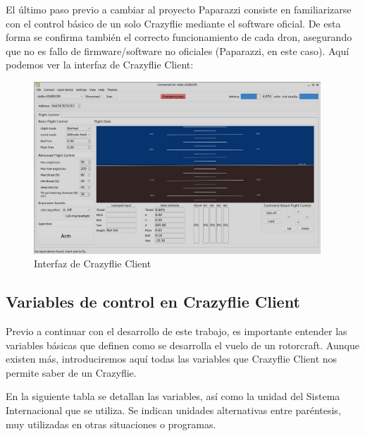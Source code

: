 El último paso previo a cambiar al proyecto Paparazzi consiste en familiarizarse con el control básico de un solo Crazyflie 
mediante el software oficial. De esta forma se confirma también el correcto funcionamiento de cada dron, asegurando que no es fallo
de firmware/software no oficiales (Paparazzi, en este caso). Aquí podemos ver la interfaz de Crazyflie Client:

\begin{figure}[h]
    \centering
    \includegraphics[width=0.96\textwidth]{img/fig/fig2.3-crazyflie-client.png}
    \caption{Interfaz de Crazyflie Client}
    \label{fig:crazyflie-client}
\end{figure}

\subsection{Variables de control en Crazyflie Client}

Previo a continuar con el desarrollo de este trabajo, es importante entender las variables básicas que definen como se desarrolla el vuelo de un rotorcraft.
Aunque existen más, introduciremos aquí todas las variables que Crazyflie Client nos permite saber de un Crazyflie. 

En la siguiente tabla se detallan las variables, así como la unidad del Sistema Internacional que se utiliza. 
Se indican unidades alternativas entre paréntesis, muy utilizadas en otras situaciones o programas. 

